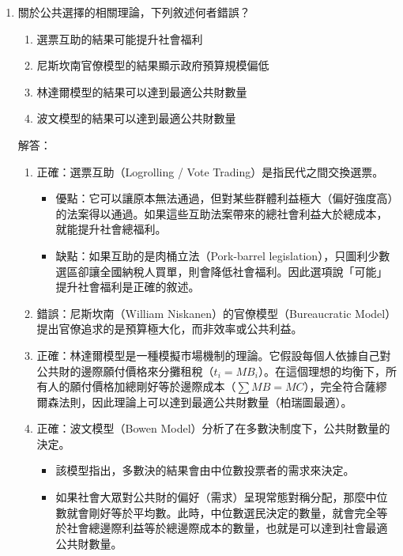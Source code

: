 \documentclass[12pt, a4paper]{article}
\begin{document}
\begin{enumerate}
    \item 關於公共選擇的相關理論，下列敘述何者錯誤？
    \begin{enumerate}[label=\Alph*.]
        \item 選票互助的結果可能提升社會福利
        \item 尼斯坎南官僚模型的結果顯示政府預算規模偏低
        \item 林達爾模型的結果可以達到最適公共財數量
        \item 波文模型的結果可以達到最適公共財數量
    \end{enumerate}
    解答：
    \begin{enumerate}[label=\Alph*.]
        \item 正確：選票互助（Logrolling / Vote Trading）是指民代之間交換選票。
            \begin{itemize}
                \item 優點：它可以讓原本無法通過，但對某些群體利益極大（偏好強度高）的法案得以通過。如果這些互助法案帶來的總社會利益大於總成本，就能提升社會總福利。
                \item 缺點：如果互助的是肉桶立法（Pork-barrel legislation），只圖利少數選區卻讓全國納稅人買單，則會降低社會福利。因此選項說「可能」提升社會福利是正確的敘述。
            \end{itemize}
        \item 錯誤：尼斯坎南（William Niskanen）的官僚模型（Bureaucratic Model）提出官僚追求的是預算極大化，而非效率或公共利益。
        \item 正確：林達爾模型是一種模擬市場機制的理論。它假設每個人依據自己對公共財的邊際願付價格來分攤租稅（\(t_i = MB_i\)）。在這個理想的均衡下，所有人的願付價格加總剛好等於邊際成本（\(\sum MB = MC\)），完全符合薩繆爾森法則，因此理論上可以達到最適公共財數量（柏瑞圖最適）。
        \item  正確：波文模型（Bowen Model）分析了在多數決制度下，公共財數量的決定。
            \begin{itemize}
                \item 該模型指出，多數決的結果會由中位數投票者的需求來決定。
                \item 如果社會大眾對公共財的偏好（需求）呈現常態對稱分配，那麼中位數就會剛好等於平均數。此時，中位數選民決定的數量，就會完全等於社會總邊際利益等於總邊際成本的數量，也就是可以達到社會最適公共財數量。
            \end{itemize}
    \end{enumerate}


\end{enumerate}
\end{document}
